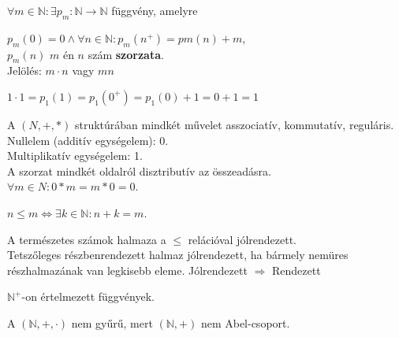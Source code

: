 \begin{frame}
  \begin{tcolorbox}[title={Def.: Szorzás}]
    ${\forall}m \in \mathbb{N} : {\exists} p_m : \mathbb{N} \rightarrow \mathbb{N}$ függvény, amelyre\\
    \mmedskip

    $p_m(0) = 0 \land {\forall}n\in \mathbb{N} : p_m(n^+) = pm(n) + m$,\\
    $p_m(n)$ $m$ én $n$ szám \textbf{szorzata}.\\
    Jelölés: $m \cdot n$ vagy $mn$
  \end{tcolorbox}

  \begin{tcolorbox}[title={Ész}]
    $1 \cdot 1 = p_1(1) = p_1(0^+) = p_1(0) + 1 = 0 + 1 = 1$
  \end{tcolorbox}
\end{frame}

\begin{frame}
  \begin{tcolorbox}[title={Tétel: Természetes számok}]
    A $(N, +, *)$ struktúrában mindkét művelet asszociatív, kommutatív, reguláris.\\
    Nullelem (additív egységelem): 0.\\
    Multiplikatív egységelem: 1.\\
    A szorzat mindkét oldalról disztributív az összeadásra.\\
    ${\forall}m \in N : 0 * m = m * 0 = 0$.
  \end{tcolorbox}
\end{frame}

\begin{frame}
\begin{tcolorbox}[title={Def.: $\mathbb{N}$ rendezése}]
  $n \leq m \iff {\exists}k \in \mathbb{N}: n + k = m$.
\end{tcolorbox}

\begin{tcolorbox}[title={Tétel: N rendezése}]
A természetes számok halmaza a $\leq$ relációval jólrendezett.\\
{\footnotesize Tetszőleges részbenrendezett halmaz jólrendezett, ha bármely nemüres részhalmazának van legkisebb eleme. Jólrendezett $\Rightarrow$ Rendezett}
\end{tcolorbox}

\begin{tcolorbox}[title={Def.: Végtelen sorozatok}]
  $\mathbb{N}^+$-on értelmezett függvények.
\end{tcolorbox}


\begin{tcolorbox}[title={Ész}]
  A $(\mathbb{N}, +, {\cdot})$ nem gyűrű, mert $(\mathbb{N}, +)$ nem Abel-csoport.
\end{tcolorbox}
\end{frame}

